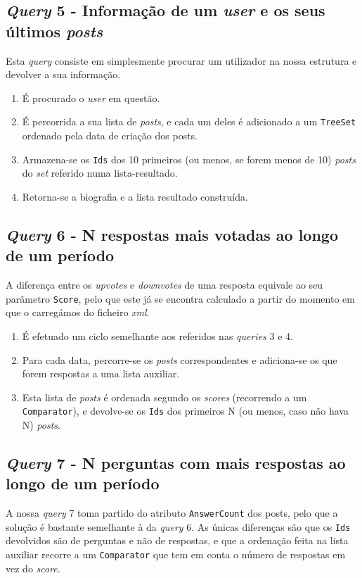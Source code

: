 \documentclass[10pt]{article}
\begin{document}
	\subsection*{\textit{Query} 5 - Informação de um \textit{user} e os seus últimos \textit{posts}}
			Esta \textit{query} consiste em simplesmente procurar um utilizador na nossa estrutura
		e devolver a sua informação.			
		\begin{enumerate}
			\item É procurado o \textit{user} em questão.
			\item É percorrida a sua lista de \textit{posts}, e cada 
		um deles é adicionado a um \texttt{TreeSet} ordenado pela
		data de criação dos posts.
			\item Armazena-se os \texttt{Ids} dos 10 primeiros (ou 
		menos, se forem menos de 10) \textit{posts} do \textit{set} 
		referido numa lista-resultado.
			\item Retorna-se a biografia e a lista resultado 
			construída.
		\end{enumerate}
	\subsection*{\textit{Query} 6 - N respostas mais votadas ao longo de um período}
			A diferença entre os \textit{upvotes} e \textit{downvotes} de uma resposta
		equivale ao seu parâmetro \texttt{Score}, pelo que este já se encontra calculado
		a partir do momento em que o carregámos do ficheiro \textit{xml}.
			\begin{enumerate}
				\item É efetuado um ciclo semelhante aos referidos 
			nas \textit{queries} 3 e 4.
				\item Para cada data, percorre-se os \textit{posts} 
			correspondentes e adiciona-se os que forem respostas 
			a uma lista auxiliar.
				\item Esta lista de \textit{posts} é ordenada 
			segundo os \textit{scores} (recorrendo a um 
			\texttt{Comparator}), e devolve-se os \texttt{Ids} dos 
			primeiros N (ou menos, caso não hava N) \textit{posts}.
			\end{enumerate}
	\subsection*{\textit{Query} 7 - N perguntas com mais respostas ao longo de um período}
			A nossa \textit{query} 7 toma partido do atributo
		\texttt{AnswerCount} dos posts, pelo que a solução é bastante 
		semelhante à da \textit{query} 6. As únicas diferenças são 
		que os \texttt{Ids} devolvidos são de perguntas e não de 
		respostas, e que a ordenação feita na lista auxiliar 
		recorre a um \texttt{Comparator} que tem em conta o número
		de respostas em vez do \textit{score}.
\end{document}
